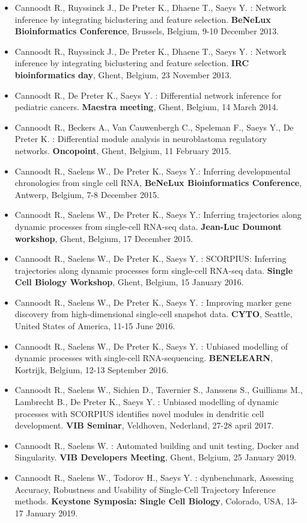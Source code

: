 \begin{itemize}
  \item Cannoodt R., Ruyssinck J., De Preter K., Dhaene T., Saeys Y. : Network inference by integrating biclustering and feature selection. \textbf{BeNeLux Bioinformatics Conference}, Brussels, Belgium, 9-10 December 2013.
  \item Cannoodt R., Ruyssinck J., De Preter K., Dhaene T., Saeys Y. : Network inference by integrating biclustering and feature selection. \textbf{IRC bioinformatics day}, Ghent, Belgium, 23 November 2013.
  \item Cannoodt R., De Preter K., Saeys Y. : Differential network inference for pediatric cancers. \textbf{Maestra meeting}, Ghent, Belgium, 14 March 2014.
  \item Cannoodt R., Beckers A., Van Cauwenbergh C., Speleman F., Saeys Y., De Preter K. : Differential module analysis in neuroblastoma regulatory networks. \textbf{Oncopoint}, Ghent, Belgium, 11 February 2015.
  \item Cannoodt R., Saelens W., De Preter K., Saeys Y.: Inferring developmental chronologies from single cell RNA, \textbf{BeNeLux Bioinformatics Conference}, Antwerp, Belgium, 7-8 December 2015.
  \item Cannoodt R., Saelens W., De Preter K., Saeys Y.: Inferring trajectories along dynamic processes from single-cell RNA-seq data. \textbf{Jean-Luc Doumont workshop}, Ghent, Belgium, 17 December 2015.
  \item Cannoodt R., Saelens W., De Preter K., Saeys Y. : SCORPIUS: Inferring trajectories along dynamic processes form single-cell RNA-seq data. \textbf{Single Cell Biology Workshop}, Ghent, Belgium, 15 January 2016.
  \item Cannoodt R., Saelens W., De Preter K., Saeys Y. : Improving marker gene discovery from high-dimensional single-cell snapshot data. \textbf{CYTO}, Seattle, United States of America, 11-15 June 2016.
  \item Cannoodt R., Saelens W., De Preter K., Saeys Y. : Unbiased modelling of dynamic processes with single-cell RNA-sequencing. \textbf{BENELEARN}, Kortrijk, Belgium, 12-13 September 2016.
  \item Cannoodt R., Saelens W., Sichien D., Tavernier S., Janssens S., Guilliams M., Lambrecht B., De Preter K., Saeys Y. : Unbiased modelling of dynamic processes with SCORPIUS identifies novel modules in dendritic cell development. \textbf{VIB Seminar}, Veldhoven, Nederland, 27-28 april 2017.
  \item Cannoodt R., Saelens W. : Automated building and unit testing, Docker and Singularity. \textbf{VIB Developers Meeting}, Ghent, Belgium, 25 January 2019.
  \item Cannoodt R., Saelens W., Todorov H., Saeys Y. : dynbenchmark, Assessing Accuracy, Robustness and Usability of Single-Cell Trajectory Inference methods. \textbf{Keystone Symposia: Single Cell Biology}, Colorado, USA, 13-17 January 2019.
\end{itemize}

